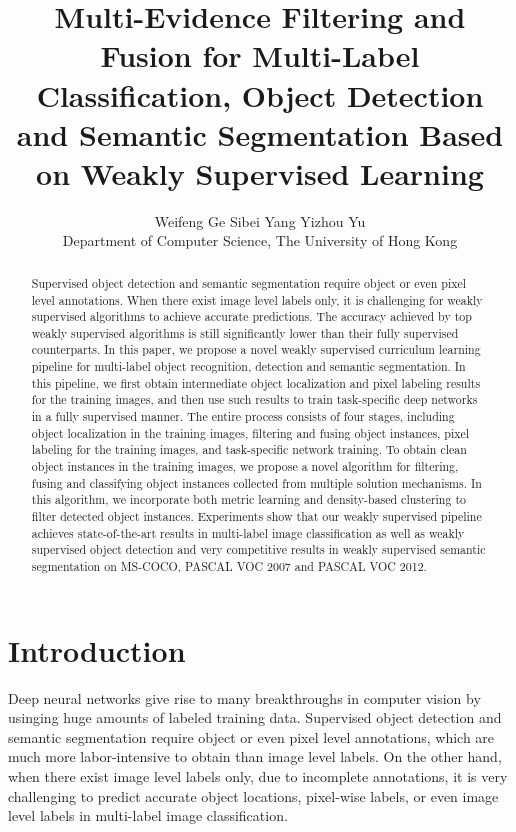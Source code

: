 \documentclass[10pt,twocolumn,letterpaper]{article}
\begin{document}
\title{\large \bf Multi-Evidence Filtering and Fusion for Multi-Label Classification, Object Detection and Semantic Segmentation Based on Weakly Supervised Learning}

\author{Weifeng Ge \hspace{0.8in} Sibei Yang \hspace{0.8in} Yizhou Yu\\
Department of Computer Science, The University of Hong Kong
}

\maketitle


\begin{abstract}
Supervised object detection and semantic segmentation require object or even pixel level annotations. When there exist image level labels only, it is challenging for weakly supervised algorithms to achieve accurate predictions. The accuracy achieved by top weakly supervised algorithms is still significantly lower than their fully supervised counterparts. In this paper, we propose a novel weakly supervised curriculum learning pipeline for multi-label object recognition, detection and semantic segmentation. In this pipeline, we first obtain intermediate object localization and pixel labeling results for the training images, and then use such results to train task-specific deep networks in a fully supervised manner. The entire process consists of four stages, including object localization in the training images, filtering and fusing object instances, pixel labeling for the training images, and task-specific network training. To obtain clean object instances in the training images, we propose a novel algorithm for filtering, fusing and classifying object instances collected from multiple solution mechanisms. In this algorithm, we incorporate both metric learning and density-based clustering to filter detected object instances. Experiments show that our weakly supervised pipeline achieves state-of-the-art results in multi-label image classification as well as weakly supervised object detection and very competitive results in weakly supervised semantic segmentation on MS-COCO, PASCAL VOC 2007 and PASCAL VOC 2012.



\end{abstract}

\section{Introduction}
Deep neural networks give rise to many breakthroughs in computer vision by usinging huge amounts of labeled training data. Supervised object detection and semantic segmentation require object or even pixel level annotations, which are much more labor-intensive to obtain than image level labels. On the other hand, when there exist image level labels only, due to incomplete annotations, it is very challenging to predict accurate object locations, pixel-wise labels, or even image level labels in multi-label image classification.
\end{document}
